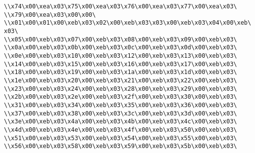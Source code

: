 \verb|\\x74\x00\xea\x03\x75\x00\xea\x03\x76\x00\xea\x03\x77\x00\xea\x03\|\newline
\verb|\\x79\x00\xea\x03\x00\x00\|\newline
\verb|\\x01\x00\x01\x00\xeb\x03\x02\x00\xeb\x03\x03\x00\xeb\x03\x04\x00\xeb\x03\|\newline
\verb|\\x05\x00\xeb\x03\x07\x00\xeb\x03\x08\x00\xeb\x03\x09\x00\xeb\x03\|\newline
\verb|\\x0a\x00\xeb\x03\x0b\x00\xeb\x03\x0c\x00\xeb\x03\x0d\x00\xeb\x03\|\newline
\verb|\\x0e\x00\xeb\x03\x10\x00\xeb\x03\x12\x00\xeb\x03\x13\x00\xeb\x03\|\newline
\verb|\\x14\x00\xeb\x03\x15\x00\xeb\x03\x16\x00\xeb\x03\x17\x00\xeb\x03\|\newline
\verb|\\x18\x00\xeb\x03\x19\x00\xeb\x03\x1a\x00\xeb\x03\x1d\x00\xeb\x03\|\newline
\verb|\\x1e\x00\xeb\x03\x20\x00\xeb\x03\x21\x00\xeb\x03\x22\x00\xeb\x03\|\newline
\verb|\\x23\x00\xeb\x03\x24\x00\xeb\x03\x28\x00\xeb\x03\x29\x00\xeb\x03\|\newline
\verb|\\x2b\x00\xeb\x03\x2e\x00\xeb\x03\x2f\x00\xeb\x03\x30\x00\xeb\x03\|\newline
\verb|\\x31\x00\xeb\x03\x34\x00\xeb\x03\x35\x00\xeb\x03\x36\x00\xeb\x03\|\newline
\verb|\\x37\x00\xeb\x03\x38\x00\xeb\x03\x3c\x00\xeb\x03\x3d\x00\xeb\x03\|\newline
\verb|\\x3e\x00\xeb\x03\x4a\x00\xeb\x03\x4b\x00\xeb\x03\x4c\x00\xeb\x03\|\newline
\verb|\\x4d\x00\xeb\x03\x4e\x00\xeb\x03\x4f\x00\xeb\x03\x50\x00\xeb\x03\|\newline
\verb|\\x51\x00\xeb\x03\x53\x00\xeb\x03\x54\x00\xeb\x03\x55\x00\xeb\x03\|\newline
\verb|\\x56\x00\xeb\x03\x58\x00\xeb\x03\x59\x00\xeb\x03\x5b\x00\xeb\x03\|\newline
